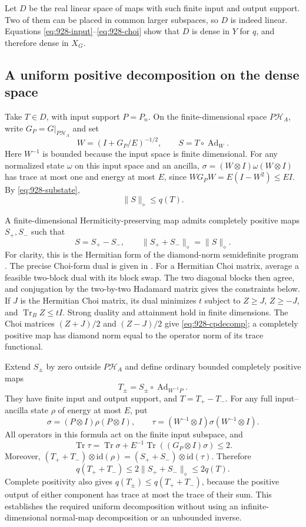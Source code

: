 \documentclass[11pt,a4paper]{article}
\theoremstyle{remark}
\begin{document}
Let $D$ be the real linear space of maps with such finite input and output
support. Two of them can be placed in common larger subspaces, so $D$ is
indeed linear. Equations \eqref{eq:928-input}--\eqref{eq:928-choi} show that
$D$ is dense in $Y$ for $q$, and therefore dense in $X_G$.

\subsection{A uniform positive decomposition on the dense space}

Take $T\in D$, with input support $P=P_n$. On the finite-dimensional space
$P\mathcal H_A$, write $G_P=G|_{P\mathcal H_A}$ and set
\[
 W=(I+G_P/E)^{-1/2},\qquad S=T\circ\operatorname{Ad}_W.
\]
Here $W^{-1}$ is bounded because the input space is finite dimensional.
For any normalized state $\omega$ on this input space and an ancilla,
$\sigma=(W\otimes I)\omega(W\otimes I)$ has trace at most one and energy
at most $E$, since $WG_PW=E(I-W^2)\le EI$. By
\eqref{eq:928-substate},
\[
 \|S\|_\diamond\le q(T).
 \tag{928.4}\label{eq:928-weight}
\]

A finite-dimensional Hermiticity-preserving map admits completely positive
maps $S_+,S_-$ such that
\[
 S=S_+-S_-,\qquad
 \|S_++S_-\|_\diamond=\|S\|_\diamond.
 \tag{928.5}\label{eq:928-cpdecomp}
\]
For clarity, this is the Hermitian form of the diamond-norm semidefinite
program \cite{Watrous2009}. The precise Choi-form dual is given in
\cite[Theorem 6 and Section 3.2, pp.~10--12]{Watrous2012}.
For a Hermitian Choi matrix, average a feasible two-block dual with its
block swap. The two diagonal blocks then agree, and conjugation by the
two-by-two Hadamard matrix gives the constraints below.
If $J$ is the Hermitian Choi matrix, its dual
minimizes $t$ subject to $Z\ge J$, $Z\ge-J$, and
$\operatorname{Tr}_B Z\le tI$. Strong duality and attainment hold in finite
dimensions. The Choi matrices $(Z+J)/2$ and $(Z-J)/2$ give
\eqref{eq:928-cpdecomp}; a completely positive map has diamond norm equal to
the operator norm of its trace functional.

Extend $S_\pm$ by zero outside $P\mathcal H_A$ and define ordinary bounded
completely positive maps
\[
 T_\pm=S_\pm\circ\operatorname{Ad}_{W^{-1}P}.
\]
They have finite input and output support, and $T=T_+-T_-$. For any full
input--ancilla state $\rho$ of energy at most $E$, put
\[
 \sigma=(P\otimes I)\rho(P\otimes I),\qquad
 \tau=(W^{-1}\otimes I)\sigma(W^{-1}\otimes I).
\]
All operators in this formula act on the finite input subspace, and
\[
 \operatorname{Tr}\tau
 =\operatorname{Tr}\sigma+E^{-1}\operatorname{Tr}((G_P\otimes I)\sigma)
 \le2.
\]
Moreover, $(T_++T_-)\otimes\mathrm{id}(\rho)
=(S_++S_-)\otimes\mathrm{id}(\tau)$. Therefore
\[
 q(T_++T_-)\le2\|S_++S_-\|_\diamond\le2q(T).
 \tag{928.6}\label{eq:928-uniform}
\]
Complete positivity also gives $q(T_\pm)\le q(T_++T_-)$, because the
positive output of either component has trace at most the trace of their
sum. This establishes the required uniform decomposition without using an
infinite-dimensional normal-map decomposition or an unbounded inverse.
\end{document}
